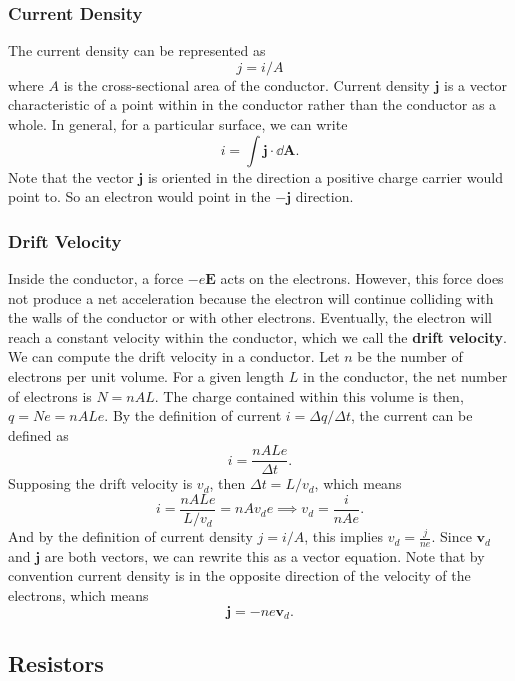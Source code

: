 \documentclass[12pt]{article}
\let\vec\mathbf
\begin{document}
  \subsubsection{Current Density}
  The current density can be represented as 
  \[j = i/A\]
  where $A$ is the cross-sectional area of the conductor. Current density $\vec j$ is a vector characteristic of a point within in the conductor rather than the conductor as a whole. In general, for a particular surface, we can write 
  \[i = \int \vec j \cdot \dd \vec A.\]
  Note that the vector $\vec j$ is oriented in the direction a positive charge carrier would point to. So an electron would point in the $-\vec j$ direction. 
  \subsubsection{Drift Velocity}
  Inside the conductor, a force $-e\vec E$ acts on the electrons. However, this force does not produce a net acceleration because the electron will continue colliding with the walls of the conductor or with other electrons. Eventually, the electron will reach a constant velocity within the conductor, which we call the \textbf{drift velocity}. We can compute the drift velocity in a conductor. Let $n$ be the number of electrons per unit volume. For a given length $L$ in the conductor, the net number of electrons is $N = nAL$. The charge contained within this volume is then, $q = Ne = nALe$. By the definition of current $i = \Delta q/\Delta t$, the current can be defined as 
  \[i = \frac{nALe}{\Delta t}.\]
  Supposing the drift velocity is $v_d$, then $\Delta t = L/v_d$, which means 
  \[i = \frac{nALe}{L/v_d} = nAv_d e\implies v_d = \frac{i}{nAe}.\]
  And by the definition of current density $j = i/A$, this implies $v_d =\frac{j}{ne}$. Since $\vec v_d$ and $\vec j$ are both vectors, we can rewrite this as a vector equation. Note that by convention current density is in the opposite direction of the velocity of the electrons, which means 
  \[\vec j = -ne\vec v_d.\]
  \subsection{Resistors}
\end{document}
